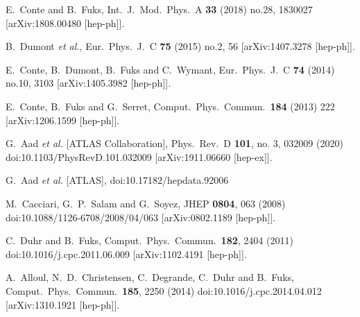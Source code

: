 \documentclass{ws-mpla}
\begin{document}
\begin{thebibliography}{99}
  E.~Conte and B.~Fuks,
  Int.\ J.\ Mod.\ Phys.\ A {\bf 33} (2018) no.28,  1830027
  [arXiv:1808.00480 [hep-ph]].

  B.~Dumont {\it et al.},
  Eur.\ Phys.\ J.\ C {\bf 75} (2015) no.2,  56
  [arXiv:1407.3278 [hep-ph]].

  E.~Conte, B.~Dumont, B.~Fuks and C.~Wymant,
  Eur.\ Phys.\ J.\ C {\bf 74} (2014) no.10,  3103
  [arXiv:1405.3982 [hep-ph]].

  E.~Conte, B.~Fuks and G.~Serret,
  Comput.\ Phys.\ Commun.\  {\bf 184} (2013) 222
  [arXiv:1206.1599 [hep-ph]].

  G.~Aad {\it et al.} [ATLAS Collaboration],
  Phys.\ Rev.\ D {\bf 101}, no. 3, 032009 (2020)
  doi:10.1103/PhysRevD.101.032009
  [arXiv:1911.06660 [hep-ex]].

G.~Aad \textit{et al.} [ATLAS],
doi:10.17182/hepdata.92006

  M.~Cacciari, G.~P.~Salam and G.~Soyez,
  JHEP {\bf 0804}, 063 (2008)
  doi:10.1088/1126-6708/2008/04/063
  [arXiv:0802.1189 [hep-ph]].

  C.~Duhr and B.~Fuks,
  Comput.\ Phys.\ Commun.\  {\bf 182}, 2404 (2011)
  doi:10.1016/j.cpc.2011.06.009
  [arXiv:1102.4191 [hep-ph]].
  
  A.~Alloul, N.~D.~Christensen, C.~Degrande, C.~Duhr and B.~Fuks,
  Comput.\ Phys.\ Commun.\  {\bf 185}, 2250 (2014)
  doi:10.1016/j.cpc.2014.04.012
  [arXiv:1310.1921 [hep-ph]].


\end{thebibliography}
\end{document}
